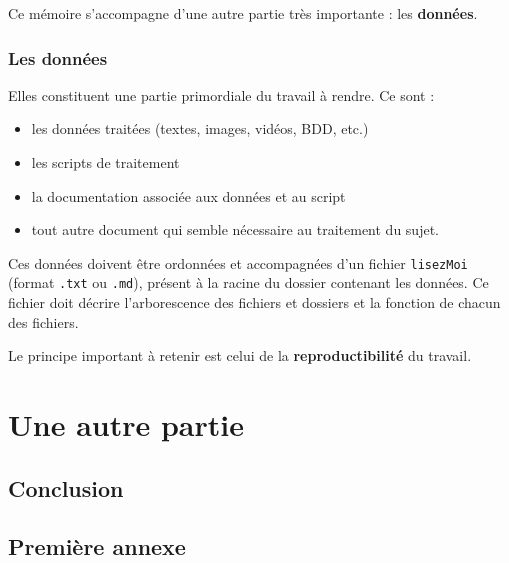 \documentclass[a4paper,12pt,twoside]{book}
\begin{document}
	Ce mémoire s'accompagne d'une autre partie très importante : les \textbf{données}.
	
	\section{Les données}
	
	Elles constituent une partie primordiale du travail à rendre. Ce sont :
	\begin{itemize}
		\item les données traitées (textes, images, vidéos, BDD, etc.)
		\item les scripts de traitement
		\item la documentation associée aux données et au script
		\item tout autre document qui semble nécessaire au traitement du sujet.
	\end{itemize}
	
	Ces données doivent être ordonnées et accompagnées d'un fichier \texttt{lisezMoi} (format \texttt{.txt} ou \texttt{.md}), présent à la racine du dossier contenant les données. Ce fichier doit décrire l'arborescence des fichiers et dossiers et la fonction de chacun des fichiers.
	
	Le principe important à retenir est celui de la \textbf{reproductibilité} du travail.
	
	\part{Une autre partie}
	
	
	\chapter*{Conclusion}
	
	\appendix
	\chapter{Première annexe}
	
	\backmatter
	
	\tableofcontents
	
\end{document}
